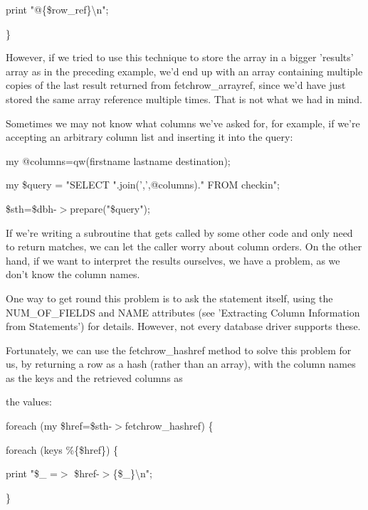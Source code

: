 \documentclass[a4paper,11pt]{book}
\begin{document}
\noindent print "@\{\$row\_ref\}\textbackslash n";

\noindent \}

\noindent 

\noindent However, if we tried to use this technique to store the array in a bigger 'results' array as in the preceding example, we'd end up with an array containing multiple copies of the last result returned from fetchrow\_arrayref, since we'd have just stored the same array reference multiple times. That is not what we had in mind.

\noindent 

\noindent Sometimes we may not know what columns we've asked for, for example, if we're accepting an arbitrary column list and inserting it into the query:

\noindent 

\noindent my @columns=qw(firstname lastname destination);

\noindent my \$query = "SELECT ".join(',',@columns)." FROM checkin";

\noindent \$sth=\$dbh-$>$prepare("\$query");

\noindent 

\noindent If we're writing a subroutine that gets called by some other code and only need to return matches, we can let the caller worry about column orders. On the other hand, if we want to interpret the results ourselves, we have a problem, as we don't know the column names.

\noindent 

\noindent One way to get round this problem is to ask the statement itself, using the NUM\_OF\_FIELDS and NAME attributes (see 'Extracting Column Information from Statements') for details. However, not every database driver supports these.

\noindent 

\noindent Fortunately, we can use the fetchrow\_hashref method to solve this problem for us, by returning a row as a hash (rather than an array), with the column names as the keys and the retrieved columns as

\noindent the values:

\noindent 

\noindent foreach (my \$href=\$sth-$>$fetchrow\_hashref) \{

\noindent foreach (keys \%\{\$href\}) \{

\noindent print "\$\_  =$>$ \$href-$>$\{\$\_\}\textbackslash n";

\noindent \}
\end{document}
